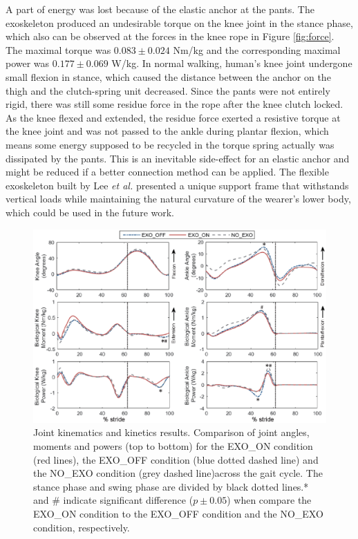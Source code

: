 \documentclass[twocolumn,cleanfoot,10pt]{asme2ej}
\begin{document}
A part of energy was lost because of the elastic anchor at the pants. The exoskeleton produced an undesirable torque on the knee joint in the stance phase, which also can be observed at the forces in the knee rope in Figure \ref{fig:force}. The maximal torque was $0.083\pm0.024$ Nm/kg and the corresponding maximal power was $0.177\pm0.069$ W/kg. In normal walking, human’s knee joint undergone small flexion in stance, which caused the distance between the anchor on the thigh and the clutch-spring unit decreased. Since the pants were not entirely rigid, there was still some residue force in the rope after the knee clutch locked. As the knee flexed and extended, the residue force exerted a resistive torque at the knee joint and was not passed to the ankle during plantar flexion, which means some energy supposed to be recycled in the torque spring actually was dissipated by the pants. This is an inevitable side-effect for an elastic anchor and might be reduced if a better connection method can be applied. The flexible exoskeleton built by Lee \emph{et al.} \cite{exosuit} presented a unique support frame that withstands vertical loads while maintaining the natural curvature of the wearer's lower body, which could be used in the future work.

\begin{figure}[th]
	\centering
	\includegraphics[width=17cm]{compare.eps}
	\caption{Joint kinematics and kinetics results. Comparison of joint angles, moments and powers (top to bottom) for the EXO\_ON condition (red lines), the EXO\_OFF condition (blue dotted dashed line) and the NO\_EXO condition (grey dashed line)across the gait cycle. The stance phase and swing phase are divided by black dotted lines.* and \# indicate significant difference ($p\pm0.05$) when compare the EXO\_ON condition to the EXO\_OFF condition and the NO\_EXO condition, respectively.}
	\label{fig:kinetics}
\end{figure}
\end{document}
